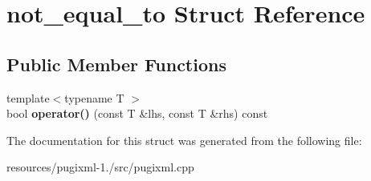 \hypertarget{structnot__equal__to}{\section{not\+\_\+equal\+\_\+to Struct Reference}
\label{structnot__equal__to}
}
\subsection*{Public Member Functions}
\begin{DoxyCompactItemize}
\item 
\hypertarget{structnot__equal__to_acbcb7d0809378458b52e6ed1a07c1d7d}{{\footnotesize template$<$typename T $>$ }\\bool {\bfseries operator()} (const T \&lhs, const T \&rhs) const }\label{structnot__equal__to_acbcb7d0809378458b52e6ed1a07c1d7d}

\end{DoxyCompactItemize}


The documentation for this struct was generated from the following file\+:\begin{DoxyCompactItemize}
\item 
resources/pugixml-\/1./src/pugixml.\+cpp\end{DoxyCompactItemize}
